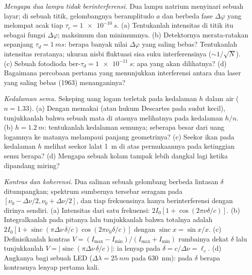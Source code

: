 \begin{exercise}[$\star\star$]\label{exo:b2:scalar-light-model:8}
\emph{Mengapa dua lampu tidak berinterferensi.} Dua lampu natrium menyinari sebuah
layar; di sebuah titik, gelombangnya beramplitudo $a$ dan berbeda
fase $\Delta\varphi$ yang melompat acak tiap $\tau_c = \qty{1e-10}{s}$. (a)
Tentukanlah intensitas di titik itu sebagai fungsi $\Delta\varphi$; maksimum dan
minimumnya. (b) Detektornya merata-ratakan sepanjang $\tau_d = \qty{1}{ms}$: berapa banyak
nilai $\Delta\varphi$ yang saling bebas? Tentukanlah intensitas reratanya; ukuran nisbi
fluktuasi sisa suku interferensinya ($\sim 1/\sqrt N$). (c) Sebuah
fotodioda ber-$\tau_d = \qty{1e-11}{s}$: apa yang akan dilihatnya? (d) Bagaimana
percobaan pertama yang menunjukkan interferensi antara dua laser yang saling bebas
(1963) menanganinya?
\end{exercise}

\begin{exercise}[$\star\star$]\label{exo:b2:scalar-light-model:9}
\emph{Kedalaman semu.} Sekeping uang logam terletak pada kedalaman $h$ dalam air ($n = 1.33$).
(a) Dengan memakai  (atau hukum Descartes pada sudut kecil), tunjukkanlah
bahwa sebuah mata di atasnya melihatnya pada kedalaman $h/n$. (b) $h = \qty{1.2}{m}$: tentukanlah kedalaman
semunya; seberapa besar  dari uang logamnya ke matanya
melampaui panjang geometrinya? (c) Seekor ikan pada kedalaman $h$ melihat seekor lalat \qty{1}{m}
di atas permukaannya pada ketinggian semu berapa? (d) Mengapa sebuah kolam tampak
lebih dangkal lagi ketika dipandang miring?
\end{exercise}

\begin{exercise}[$\star\star\star$]\label{exo:b2:scalar-light-model:10}
\emph{Kontras dan koherensi.} Dua salinan sebuah gelombang berbeda lintasan
$\delta$ ditumpangkan; spektrum sumbernya tersebar
seragam pada $[\nu_0 - \Delta\nu/2, \nu_0 + \Delta\nu/2]$, dan tiap frekuensinya
hanya berinterferensi dengan dirinya sendiri. (a) Intensitas dari satu frekuensi: $2I_0
[1 + \cos(2\pi\nu\delta/c)]$. (b) Integralkanlah pada pitanya lalu tunjukkanlah bahwa
totalnya adalah $2I_0[1 + \operatorname{sinc}(\pi\Delta\nu\,\delta/c)\cos(2\pi\nu_0\delta/c)]$ dengan
$\operatorname{sinc}x = \sin x/x$. (c) Definisikanlah kontras $V = (I_{\max} -
I_{\min})/(I_{\max} + I_{\min})$ rumbainya dekat $\delta$ lalu tunjukkanlah $V =
|\operatorname{sinc}(\pi\Delta\nu\,\delta/c)|$: ia lenyap pada $\delta = c/\Delta\nu = \ell_c$. (d)
Angkanya bagi sebuah LED ($\Delta\lambda = \qty{25}{nm}$ pada \qty{630}{nm}): pada $\delta$ berapa
kontrasnya lenyap pertama kali.
\end{exercise}


